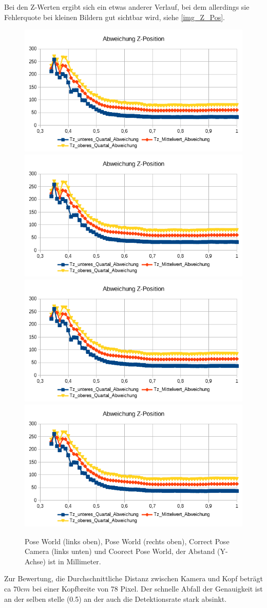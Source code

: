 Bei den Z-Werten ergibt sich ein etwas anderer Verlauf, bei dem allerdings sie Fehlerquote bei kleinen Bildern gut sichtbar wird, siehe \autoref{img_Z_Pos}.\\
\begin{figure}
	\centering
	\includegraphics[width=0.45\linewidth]{tabelle/Z_Pos_PC}
	\includegraphics[width=0.45\linewidth]{tabelle/Z_Pos_PW}
	\includegraphics[width=0.45\linewidth]{tabelle/Z_Pos_CPC}
	\includegraphics[width=0.45\linewidth]{tabelle/Z_Pos_CPW}
	\caption{Pose World (links oben), Pose World (rechts oben), Correct Pose Camera (links unten) und Coorect Pose World, der Abstand (Y-Achse) ist in Millimeter.}
	\label{img_Z_Pos}
\end{figure}
Zur Bewertung, die Durchschnittliche Distanz zwischen Kamera und Kopf beträgt ca $70cm$ bei einer Kopfbreite von 78 Pixel. Der schnelle Abfall der Genauigkeit ist an der selben stelle (0.5) an der auch die Detektionsrate stark absinkt.
